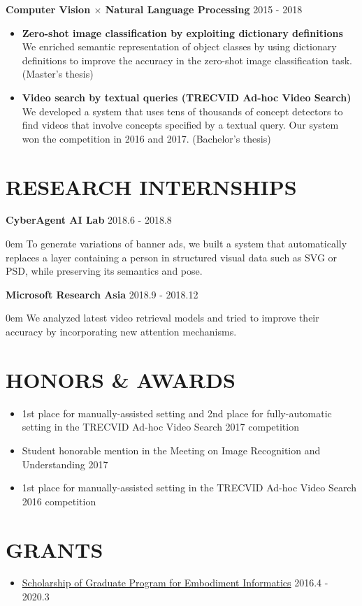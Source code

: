 \documentclass[paper=a4,fontsize=11pt]{scrartcl} %
\newcommand{\sepspace}{\vspace*{1em}}        %
\newcommand{\NewPart}[1]{\section*{\uppercase{#1}}}
\newcommand{\EducationEntry}[3]{
        \noindent \textbf{#1} \hfill      %
      #2 \par  %
        \begin{addmargin}[2em]{0em}
            #3
        \end{addmargin}}
\begin{document}
\sepspace

\noindent \textbf{Computer Vision $\times$ Natural Language Processing} \hfill 2015 - 2018
\begin{itemize}[leftmargin=2em,topsep=0.5em,itemsep=0em]
    \item \textbf{Zero-shot image classification by exploiting dictionary definitions} \\
    We enriched semantic representation of object classes by using dictionary
    definitions to improve the accuracy in the zero-shot image classification task.
    (Master's thesis)
    \item \textbf{Video search by textual queries (TRECVID Ad-hoc Video Search)} \\
    We developed a system that uses tens of thousands of concept detectors to
    find videos that involve concepts specified by a textual query. Our system
    won the competition in 2016 and 2017. (Bachelor's thesis)
\end{itemize}

\NewPart{Research Internships}{}

\EducationEntry{CyberAgent AI Lab}{2018.6 - 2018.8}{To generate variations of
banner ads, we built a system that automatically replaces a layer containing a
person in structured visual data such as SVG or PSD, while preserving its
semantics and pose.}

\sepspace

\EducationEntry{Microsoft Research Asia}{2018.9 - 2018.12}{We analyzed latest
video retrieval models and tried to improve their accuracy by incorporating new
attention mechanisms.}

\NewPart{Honors \& Awards}{}
\begin{itemize}[leftmargin=2em,topsep=0.5em,itemsep=0em]
    \item 1st place for manually-assisted setting and 2nd place for
    fully-automatic setting in the TRECVID Ad-hoc Video Search 2017 competition
    \item Student honorable mention in the Meeting on Image Recognition and
    Understanding 2017
    \item 1st place for manually-assisted setting in the TRECVID Ad-hoc Video
    Search 2016 competition
\end{itemize}

\NewPart{Grants}{}
\begin{itemize}[leftmargin=2em,topsep=0.5em,itemsep=0em]
    \item \href{http://www.leading-sn.waseda.ac.jp/en/student/scholarships/}{Scholarship of Graduate Program for Embodiment Informatics} \hfill 2016.4 - 2020.3
\end{itemize}
\end{document}
